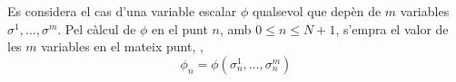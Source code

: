 Es considera el cas d'una variable escalar $\phi$ qualsevol que depèn de $m$ variables $\sigma^1, \ldots, \sigma^m$. Pel càlcul de $\phi$ en el punt $n$, amb $0 \leq n \leq N+1$, s'empra el valor de les $m$ variables en el mateix punt, \ie,
\begin{equation} \label{eq:calculo_magnitud_phi}
    \phi_n = \phi \left( \sigma_n^1, \ldots, \sigma_n^m \right)
\end{equation}
